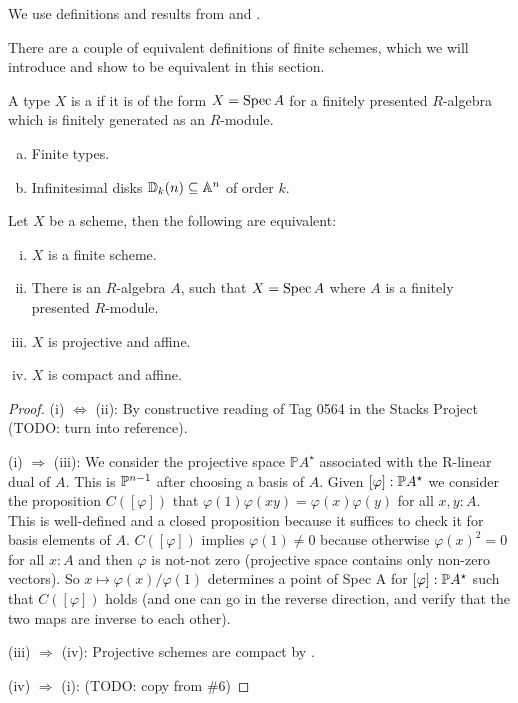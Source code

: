 We use definitions and results from \cite{draft} and \cite{proper-draft}.

There are a couple of equivalent definitions of finite schemes, which we will introduce and show to be equivalent in this section.

\begin{definition}
  A type $X$ is a  if it is of the form $X=\operatorname{Spec} A$ for a finitely presented $R$-algebra which is finitely generated as an $R$-module.
\end{definition}

\begin{example}
  \begin{enumerate}[(a)]
  \item Finite types.
  \item Infinitesimal disks $\mathbb{D}_k(n)\subseteq\mathbb{A}^n$ of order $k$.
  \end{enumerate}
\end{example}

\begin{theorem}
  Let $X$ be a scheme, then the following are equivalent:
  \begin{enumerate}[(i)]
  \item $X$ is a finite scheme.
  \item There is an $R$-algebra $A$, such that $X=\operatorname{Spec} A$ where $A$ is a finitely presented $R$-module.
  \item $X$ is projective and affine.
  \item $X$ is compact and affine.
  \end{enumerate}
\end{theorem}

\begin{proof}
  (i) $\Leftrightarrow$ (ii): By constructive reading of Tag 0564 in the Stacks Project (TODO: turn into reference).
  
  (i) $\Rightarrow$ (iii): We consider the projective space $\mathbb PA^\star$ associated with the R-linear dual of $A$.
  This is $\mathbb{P}^{n-1}$ after choosing a basis of $A$.
  Given $[\varphi] : \mathbb{P} A^\star$ we consider the proposition $C([\varphi])$ that $\varphi(1) \varphi(xy) = \varphi(x) \varphi(y)$ for all $x, y  : A$.
  This is well-defined and a closed proposition because it suffices to check it for basis elements of $A$.
  $C([\varphi])$ implies $\varphi(1) \ne 0$ because otherwise $\varphi(x)^2 = 0$ for all $x : A$ and then $\varphi$ is not-not zero (projective space contains only non-zero vectors).
  So $x \mapsto \varphi(x) / \varphi(1)$ determines a point of Spec A for $[\varphi] : \mathbb{P} A^\star$ such that $C([\varphi])$ holds (and one can go in the reverse direction, and verify that the two maps are inverse to each other).

  (iii) $\Rightarrow$ (iv): Projective schemes are compact by \cite[Theorem 3.0.7]{proper-draft}. 
  
  (iv) $\Rightarrow$ (i): (TODO: copy from \#6)
\end{proof}
